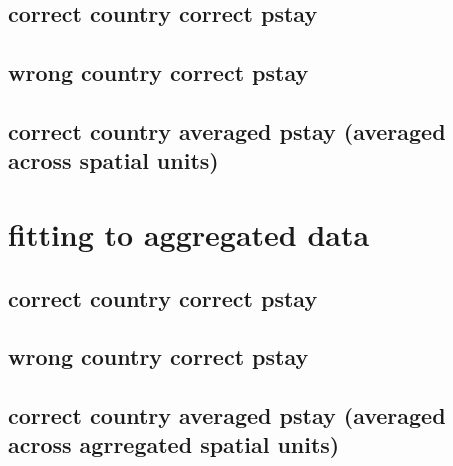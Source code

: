 \documentclass[a4paper,12pt]{article}
\begin{document}
\subsection{correct country correct pstay}
\subsection{wrong country correct pstay}
\subsection{correct country averaged pstay (averaged across spatial
  units)}
\section{fitting to aggregated data}
\subsection{correct country correct pstay}
\subsection{wrong country correct pstay}
\subsection{correct country averaged pstay (averaged across agrregated
  spatial units)}
\end{document}
